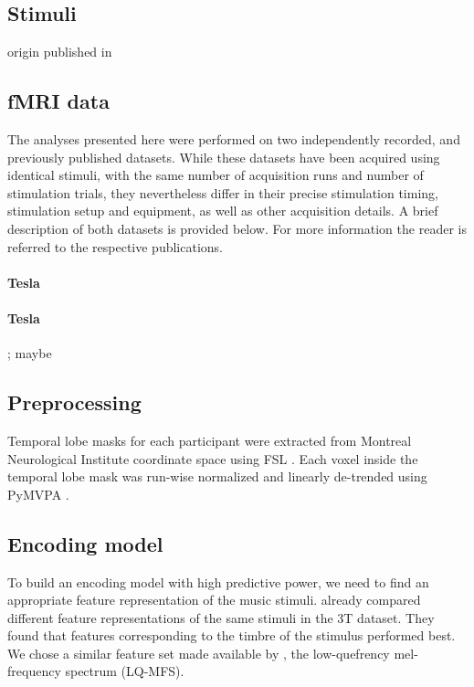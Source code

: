 \subsection*{Stimuli}

origin \citet{CTK+2012}
published in \citet{HDH+2015}

\subsection*{fMRI data}

The analyses presented here were performed on two independently recorded,
and previously published datasets. While these datasets have been acquired
using identical stimuli, with the same number of acquisition runs and
number of stimulation trials, they nevertheless differ in their precise
stimulation timing, stimulation setup and equipment, as well as other
acquisition details. A brief description of both datasets is provided below.
For more information the reader is referred to the respective publications.

\paragraph{\unit[3]{Tesla}}
%

\paragraph{\unit[7]{Tesla}}
%
\citet{HDH+2015}; maybe \citet{HBI+14}


\subsection*{Preprocessing}

Temporal lobe masks for each participant were extracted from Montreal
Neurological Institute coordinate space using FSL \citep{SJB+04,JBB+12}.
Each voxel inside the temporal lobe mask was run-wise normalized and linearly
de-trended using PyMVPA \citep{HHS09b}. 

\subsection*{Encoding model}

To build an encoding model with high predictive power, we need to find an
appropriate feature representation of the music stimuli.  \citet{CTK+2012}
already compared different feature representations of the same stimuli in the
3T dataset. They found that features corresponding to the timbre of the stimulus
performed best.
We chose a similar feature set made available by \citet{HDH+2015}, the low-quefrency
mel-frequency spectrum (LQ-MFS).


